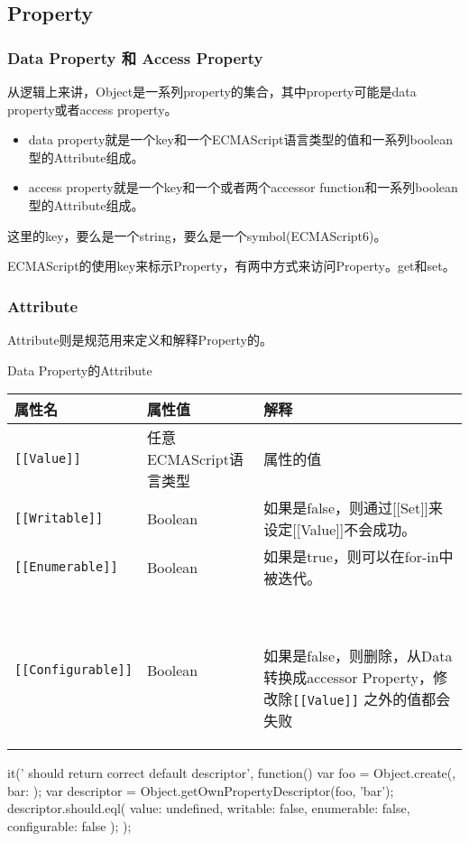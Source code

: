 \subsection{Property}

\subsubsection{Data Property 和 Access Property}

从逻辑上来讲，Object是一系列property的集合，其中property可能是data property或者access property。
\begin{itemize}
\item data property就是一个key和一个ECMAScript语言类型的值和一系列boolean型的Attribute组成。
\item access property就是一个key和一个或者两个accessor function和一系列boolean型的Attribute组成。
\end{itemize}	
这里的key，要么是一个string，要么是一个symbol(ECMAScript6)。

ECMAScript的使用key来标示Property，有两中方式来访问Property。get和set。

\subsubsection{Attribute}
Attribute则是规范用来定义和解释Property的。

Data Property的Attribute

\begin{tabular}{|l|l|l|}
\hline
属性名 & 属性值 & 解释 \\
\hline
\lstinline![[Value]]! & 任意ECMAScript语言类型 & 属性的值 \\
\hline
\lstinline![[Writable]]! & Boolean & 如果是false，则通过[[Set]]来设定[[Value]]不会成功。 \\
\hline
\lstinline![[Enumerable]]! & Boolean & 如果是true，则可以在for-in中被迭代。 \\
\hline
\lstinline![[Configurable]]! & Boolean &　\parbox[t]{8cm}{如果是false，则删除，从Data转换成accessor Property，修改除\lstinline![[Value]]! 之外的值都会失败}\\
\hline
\end{tabular}

\begin{JavaScript}
		it(' should return correct default descriptor', function(){
			var foo  = Object.create({}, {
				bar: {}
			});
			var descriptor = Object.getOwnPropertyDescriptor(foo, 'bar');
			descriptor.should.eql(
				{
					value: undefined, 
					writable: false, 
					enumerable: false, 
					configurable: false
				});
		});
\end{JavaScript}

